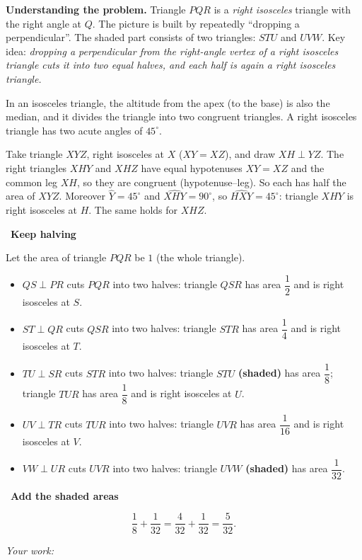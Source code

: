 \documentclass[11pt]{article}
\newif\ifsol \solfalse
\newcommand{\StuProb}[2]{\begin{probboxS}{#1}{#2}\StuProbBody\end{probboxS}}
\newcommand{\probsol}[1]{%
  \begin{lrbox}{\solmeasure}\begin{minipage}{\dimexpr\linewidth-24pt\relax}#1\end{minipage}\end{lrbox}%
  \ifsol
    \begin{solbox}#1\end{solbox}%
  \else
    \setlength{\solht}{\dimexpr\ht\solmeasure+\dp\solmeasure+0.85cm\relax}%
    \ifdim\solht<1.35cm\setlength{\solht}{1.35cm}\fi
    \ifdim\solht>\StudentMaxWork\setlength{\solht}{\StudentMaxWork}\fi
    \par\noindent\begin{minipage}{\linewidth}%
    \expandafter\StuProb\StuProbArgs
    \begin{tcolorbox}[colback=white,colframe=Line,boxrule=0.8pt,arc=5pt,
      left=8pt,right=8pt,top=4pt,bottom=4pt,height=\solht]{\footnotesize\color{Slate}\itshape\WorkWord}\end{tcolorbox}%
    \end{minipage}\par\medskip
  \fi}
\newlength{\StudentMaxWork}\setlength{\StudentMaxWork}{4.5cm}
\newcommand{\step}[2]{\par\smallskip\noindent{\bfseries\color{tmBlue!85!black}\StepWord~#1.}\ {\bfseries #2}\par\nopagebreak}
\def\WorkWord{Your work:}
\def\StepWord{Step}
\begin{document}
\probsol{
\textbf{Understanding the problem.} Triangle $PQR$ is a \emph{right isosceles} triangle with the right angle at $Q$. The picture is built by repeatedly ``dropping a perpendicular''. The shaded part consists of two triangles: $STU$ and $UVW$. Key idea: \emph{dropping a perpendicular from the right-angle vertex of a right isosceles triangle cuts it into two equal halves, and each half is again a right isosceles triangle.}

\begin{recallbox}In an isosceles triangle, the altitude from the apex (to the base) is also the median, and it divides the triangle into two congruent triangles. A right isosceles triangle has two acute angles of $45^\circ$.\end{recallbox}

\begin{proofbox}Take triangle $XYZ$, right isosceles at $X$ ($XY=XZ$), and draw $XH\perp YZ$. The right triangles $XHY$ and $XHZ$ have equal hypotenuses $XY=XZ$ and the common leg $XH$, so they are congruent (hypotenuse--leg). So each has half the area of $XYZ$. Moreover $\widehat{Y}=45^\circ$ and $\widehat{XHY}=90^\circ$, so $\widehat{HXY}=45^\circ$: triangle $XHY$ is right isosceles at $H$. The same holds for $XHZ$.\end{proofbox}

\step{1}{Keep halving}
Let the area of triangle $PQR$ be $1$ (the whole triangle).
\begin{itemize}[leftmargin=1.4em,itemsep=1pt]
\item $QS\perp PR$ cuts $PQR$ into two halves: triangle $QSR$ has area $\dfrac12$ and is right isosceles at $S$.
\item $ST\perp QR$ cuts $QSR$ into two halves: triangle $STR$ has area $\dfrac14$ and is right isosceles at $T$.
\item $TU\perp SR$ cuts $STR$ into two halves: triangle $STU$ \textbf{(shaded)} has area $\dfrac18$; triangle $TUR$ has area $\dfrac18$ and is right isosceles at $U$.
\item $UV\perp TR$ cuts $TUR$ into two halves: triangle $UVR$ has area $\dfrac1{16}$ and is right isosceles at $V$.
\item $VW\perp UR$ cuts $UVR$ into two halves: triangle $UVW$ \textbf{(shaded)} has area $\dfrac1{32}$.
\end{itemize}

\step{2}{Add the shaded areas}
\[\frac18+\frac1{32}=\frac{4}{32}+\frac{1}{32}=\frac{5}{32}.\]

}
\end{document}
